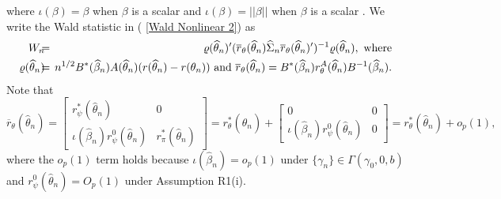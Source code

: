 \documentclass[12pt,thmsb,titlepage,final,oneside,letterpaper]{article}
\begin{document}
where $\iota (\beta )=\beta $ when $\beta $ is a scalar and $\iota (\beta
)=||\beta ||$ when $\beta $ is a scalar . We write the Wald statistic in (%
\ref{Wald Nonlinear 2}) as%
\begin{eqnarray}
W_{n}\hspace{-0.08in} &=&\hspace{-0.08in}\varrho (\widehat{\theta }%
_{n})^{\prime }(\overline{r}_{\theta }(\widehat{\theta }_{n})\widehat{\Sigma 
}_{n}\overline{r}_{\theta }(\widehat{\theta }_{n})^{\prime })^{-1}\varrho (%
\widehat{\theta }_{n}),\text{ where}  \label{Wald Nonlinear 3} \\
\varrho (\widehat{\theta }_{n})\hspace{-0.08in} &=&\hspace{-0.08in}%
n^{1/2}B^{\ast }(\widehat{\beta }_{n})A(\widehat{\theta }_{n})(r(\widehat{%
\theta }_{n})-r(\theta _{n}))\text{ and }\overline{r}_{\theta }(\widehat{%
\theta }_{n})=B^{\ast }(\widehat{\beta }_{n})r_{\theta }^{A}(\widehat{\theta 
}_{n})B^{-1}(\widehat{\beta }_{n}).  \notag
\end{eqnarray}%
Note that 
\begin{equation}
\overline{r}_{\theta }(\widehat{\theta }_{n})=\left[ 
\begin{array}{cc}
r_{\psi }^{\ast }(\widehat{\theta }_{n}) & 0 \\ 
\iota (\widehat{\beta }_{n})r_{\psi }^{0}(\widehat{\theta }_{n}) & r_{\pi
}^{\ast }(\widehat{\theta }_{n})%
\end{array}%
\right] =r_{\theta }^{\ast }(\widehat{\theta }_{n})+\left[ 
\begin{array}{cc}
0 & 0 \\ 
\iota (\widehat{\beta }_{n})r_{\psi }^{0}(\widehat{\theta }_{n}) & 0%
\end{array}%
\right] =r_{\theta }^{\ast }(\widehat{\theta }_{n})+o_{p}(1),  \label{r_bar}
\end{equation}%
where the $o_{p}\left( 1\right) $ term holds because $\iota (\widehat{\beta }%
_{n})=o_{p}\left( 1\right) $ under $\{\gamma _{n}\}\in \Gamma (\gamma
_{0},0,b)$ and $r_{\psi }^{0}(\widehat{\theta }_{n})=O_{p}(1)$ under
Assumption R1(i).
\end{document}
